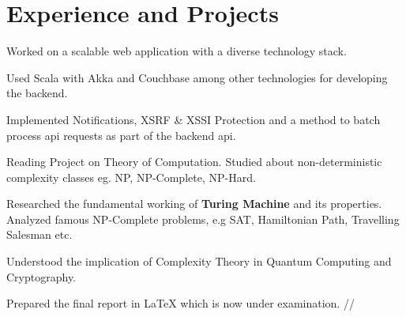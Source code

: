 \documentclass[]{deedy-resume-openfont}
\begin{document}
\hfill
\begin{minipage}[t]{0.66\textwidth} 


\section{Experience and Projects}
\vspace{0.4 cm}
\vspace{\topsep} %
\begin{tightemize}
  \item Worked on a scalable web application with a diverse technology stack.
  \item Used Scala with Akka and Couchbase among other technologies for
    developing the backend.
  \item	Implemented Notifications, XSRF \& XSSI Protection and a method
    to batch process api requests as part of the backend api. \\
\end{tightemize}
\vspace{0.2 cm}
\begin{tightemize}
  \item Reading Project on Theory of Computation. Studied about non-deterministic complexity classes eg. NP, NP-Complete, NP-Hard.
  \item Researched the fundamental working of \textbf{Turing Machine} and its properties. Analyzed famous NP-Complete problems, e.g SAT, Hamiltonian Path, Travelling Salesman etc. 
  \item Understood the implication of Complexity Theory in Quantum Computing and Cryptography.
  \item Prepared the final report in \LaTeX{} which is now under examination. //
\end{tightemize}
\vspace{1 cm}





\end{minipage}
\end{document}
